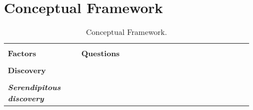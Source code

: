 \documentclass{casconpaper}
\begin{document}
{\section{Conceptual Framework}
\begin{table*}[htbp]
\caption{Conceptual Framework.}
\centering
\begin{tabular}{|p{0.30\linewidth}|p{0.70\linewidth}|}
\hline
&\\
\textbf{\large{Factors}}   & \textbf{\large{Questions}}  \\
\hline
&\\
\textbf{\large{Discovery}}                     &                                                                                                           \\

&\\
\emph{\textbf{Serendipitous discovery}}     &                                                                                                           \\


\end{tabular}
\end{table*}}
\end{document}

